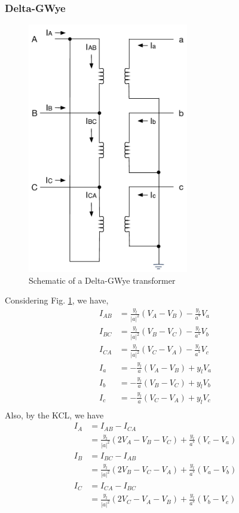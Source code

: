 \documentclass[11pt]{article}
\begin{document}
\subsubsection{Delta-GWye}
\begin{figure}
\begin{center}
\includegraphics[width=7cm]{DeltaGWye.pdf}
\caption{Schematic of a Delta-GWye transformer}
\label{FIG_DELTA_GWYE}
\end{center}
\end{figure}
Considering Fig. \ref{FIG_DELTA_GWYE}, we have,
\begin{align}
I_{AB} &= \frac{y_l}{|a|^2}(V_A - V_B) - \frac{y_l}{a^*}V_a \\
I_{BC} &= \frac{y_l}{|a|^2}(V_B - V_C) - \frac{y_l}{a^*}V_b \\
I_{CA} &= \frac{y_l}{|a|^2}(V_C - V_A) - \frac{y_l}{a^*}V_c \\
I_a &= -\frac{y_l}{a}(V_A - V_B) + y_l V_a \\
I_b &= -\frac{y_l}{a}(V_B - V_C) + y_l V_b \\
I_c &= -\frac{y_l}{a}(V_C - V_A) + y_l V_c \\
\end{align}
Also, by the KCL, we have
\begin{align}
I_A &= I_{AB} - I_{CA} \\
&= \frac{y_l}{|a|^2}(2V_A - V_B - V_C) + \frac{y_l}{a^*}(V_c - V_a) \\
I_B &= I_{BC} - I_{AB} \\
&= \frac{y_l}{|a|^2}(2V_B - V_C - V_A) + \frac{y_l}{a^*}(V_a - V_b) \\
I_C &= I_{CA} - I_{BC} \\
&= \frac{y_l}{|a|^2}(2V_C - V_A - V_B) + \frac{y_l}{a^*}(V_b - V_c)
\end{align}
\end{document}

